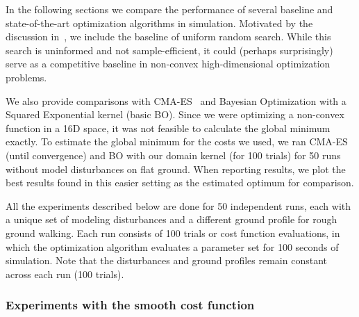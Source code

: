 In the following sections we compare the performance of several baseline and state-of-the-art optimization algorithms in simulation. Motivated by the discussion in~\cite{calandra2016bayesian}, we include the baseline of uniform random search. While this search is uninformed and not sample-efficient, it could (perhaps surprisingly) serve as a competitive baseline in non-convex high-dimensional optimization problems. 

We also provide comparisons with \mbox{CMA-ES}~\citep{hansen2006cma} and Bayesian Optimization with a Squared Exponential kernel (basic BO). Since we were optimizing a non-convex function in a 16D space, it was not feasible to calculate the global minimum exactly. To estimate the global minimum for the costs we used, we ran CMA-ES (until convergence) and BO with our domain kernel (for 100 trials) for 50 runs without model disturbances on flat ground. 
When reporting results, we plot the best results found in this easier setting as the estimated optimum for comparison.

All the experiments described below are done for 50 independent runs, each with a unique set of modeling disturbances and a different ground profile for rough ground walking. Each run  consists of 100 trials or cost function evaluations, in which the optimization algorithm evaluates a parameter set for 100 seconds of simulation. Note that the disturbances and ground profiles remain constant across each run (100 trials).

\subsubsection{Experiments with the smooth cost function}

